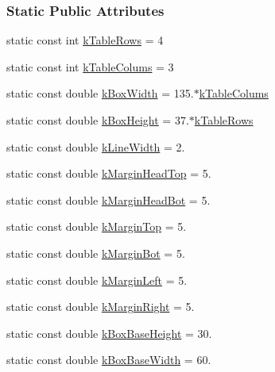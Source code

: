 \subsubsection*{Static Public Attributes}
\begin{DoxyCompactItemize}
\item 
static const int \hyperlink{class_info_bar_ad54d2dd19a63caf9d2476aace60ae3c5}{k\+Table\+Rows} = 4
\item 
static const int \hyperlink{class_info_bar_a57e9e7c40a6fd2a56dd47a4512d65489}{k\+Table\+Colums} = 3
\item 
static const double \hyperlink{class_info_bar_a58f7773f4265d7e759f2eeb4c9aac48d}{k\+Box\+Width} = 135.$\ast$\hyperlink{class_info_bar_a57e9e7c40a6fd2a56dd47a4512d65489}{k\+Table\+Colums}
\item 
static const double \hyperlink{class_info_bar_aedf2e766968ea9ba3e691f24efb8c117}{k\+Box\+Height} = 37.$\ast$\hyperlink{class_info_bar_ad54d2dd19a63caf9d2476aace60ae3c5}{k\+Table\+Rows}
\item 
static const double \hyperlink{class_info_bar_a9592abdb63cc3cfffc6e5826f998a353}{k\+Line\+Width} = 2.
\item 
static const double \hyperlink{class_info_bar_ae4ec64a4c58d29eb6c7378b4621bc6c2}{k\+Margin\+Head\+Top} = 5.
\item 
static const double \hyperlink{class_info_bar_aed15b9f28cc4a43d509c3553b032fa5e}{k\+Margin\+Head\+Bot} = 5.
\item 
static const double \hyperlink{class_info_bar_a810c3286fc4d960d04ffbd31318ebff2}{k\+Margin\+Top} = 5.
\item 
static const double \hyperlink{class_info_bar_a18194bb46d36b00aa9f0d01f24a87617}{k\+Margin\+Bot} = 5.
\item 
static const double \hyperlink{class_info_bar_a2ed246fc7b7917ba8141b55cbd023d5c}{k\+Margin\+Left} = 5.
\item 
static const double \hyperlink{class_info_bar_aa16c67708cd2ab938e1dc8be5f168614}{k\+Margin\+Right} = 5.
\item 
static const double \hyperlink{class_info_bar_a0f2f7b614000ae1d317ec3819acabbf2}{k\+Box\+Base\+Height} = 30.
\item 
static const double \hyperlink{class_info_bar_a3eb5cc879199e1a927ed76eb989c4c0e}{k\+Box\+Base\+Width} = 60.
\end{DoxyCompactItemize}
